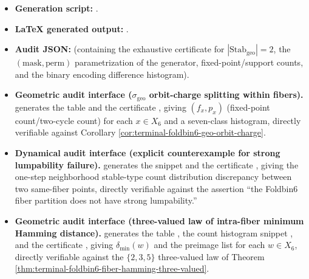 \begin{itemize}
  \item \textbf{Generation script:} \texttt{}.
  \item \textbf{LaTeX generated output:} \texttt{}.
  \item \textbf{Audit JSON:} \texttt{} (containing the exhaustive certificate for \(|\mathrm{Stab}_{\mathrm{geo}}|=2\), the \((\mathrm{mask},\mathrm{perm})\) parametrization of the generator, fixed-point/support counts, and the binary encoding difference histogram).
  \item \textbf{Geometric audit interface (\(\sigma_{\mathrm{geo}}\) orbit-charge splitting within fibers).}
  \texttt{} generates the table
  \texttt{}
  and the certificate \texttt{},
  giving \((f_x,p_x)\) (fixed-point count/two-cycle count) for each \(x\in X_6\) and a seven-class histogram, directly verifiable against Corollary \ref{cor:terminal-foldbin6-geo-orbit-charge}.
  \item \textbf{Dynamical audit interface (explicit counterexample for strong lumpability failure).}
   generates the snippet
  \texttt{}
  and the certificate \texttt{},
  giving the one-step neighborhood stable-type count distribution discrepancy between two same-fiber points, directly verifiable against the assertion ``the Foldbin6 fiber partition does not have strong lumpability.''
  \item \textbf{Geometric audit interface (three-valued law of intra-fiber minimum Hamming distance).}
   generates the table
  ,
  the count histogram snippet ,
  and the certificate ,
  giving \(\delta_{\min}(w)\) and the preimage list for each \(w\in X_6\), directly verifiable against the \(\{2,3,5\}\) three-valued law of Theorem \ref{thm:terminal-foldbin6-fiber-hamming-three-valued}.

\end{itemize}
